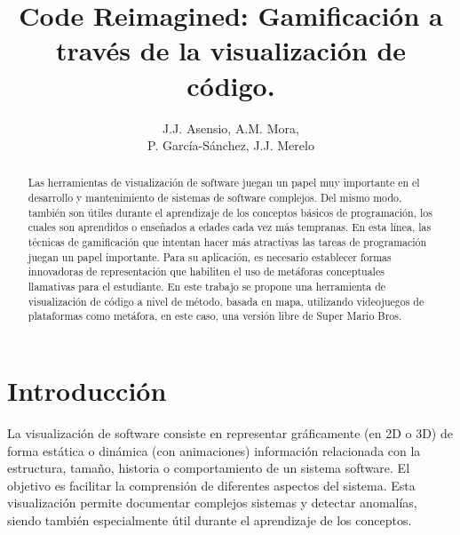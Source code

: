 \documentclass{llncs}
\begin{document}

\title{Code Reimagined: Gamificación a través de la visualización de código.}


\author{J.J. Asensio, A.M. Mora, \\P. García-Sánchez, J.J. Merelo}

\maketitle
%
%
\begin{abstract} 
Las herramientas de visualización de software juegan un papel muy importante en el desarrollo y mantenimiento de sistemas de software complejos. Del mismo modo, también son útiles durante el aprendizaje de los conceptos básicos de programación, los cuales son aprendidos o enseñados a edades cada vez más tempranas. En esta línea, las técnicas de gamificación que intentan hacer más atractivas las tareas de programación juegan un papel importante. Para su aplicación, es necesario establecer formas innovadoras de representación que habiliten el uso de metáforas conceptuales llamativas para el estudiante. En este trabajo se propone una herramienta de visualización de código a nivel de método, basada en mapa, utilizando videojuegos de plataformas como metáfora, en este caso, una versión libre de Super Mario Bros.
\end{abstract}


%
%
\section{Introducción}
\label{sec:intro}
La visualización de software consiste en representar gráficamente (en 2D o 3D) de forma estática o dinámica (con animaciones) información relacionada con la estructura, tamaño, historia o comportamiento de un sistema software. El objetivo es facilitar la comprensión de diferentes aspectos del sistema. Esta visualización permite documentar complejos sistemas y detectar anomalías, siendo también especialmente útil durante el aprendizaje de los conceptos. 
\end{document}

